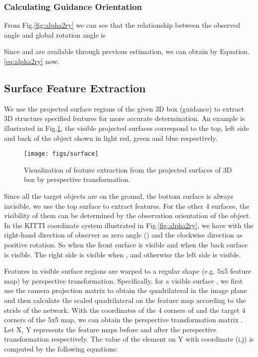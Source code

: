 \documentclass[10pt,twocolumn,letterpaper]{article}
\begin{document}
\subsubsection{Calculating Guidance Orientation } 
From Fig.\ref{fig:alpha2ry} we can see that the relationship between the observed angle  and global rotation angle  is 

Since  and  are available through previous estimation, we can obtain  by Equation.\ref{eq:alpha2ry} now. 


\subsection{Surface Feature Extraction}
\label{sec:surface}
We use the projected surface regions of the given 3D box (guidance) to extract 3D structure specified features for more accurate determination.
An example is illustrated in Fig.\ref{fig:surface}, the visible projected surfaces correspond to the top, left side and back of the object shown in light red, green and blue respectively. 

\begin{figure}[!h]
\centering
\texttt{[image: figs/surface]}
\caption{Visualization of feature extraction from the projected surfaces of 3D box by perspective transformation.}
\label{fig:surface}
\end{figure}

Since all the target objects are on the ground, the bottom surface is always invisible, we use the top surface to extract features. For the other 4 surfaces, the visibility of them can be determined by the observation orientation  of the object. In the KITTI coordinate system illustrated in Fig.\ref{fig:alpha2ry}, we have  with the right-hand direction of observer as zero angle () and the clockwise direction as positive rotation. So when  the front surface is visible and when  the back surface is visible. The right side is visible when , and otherwise the left side is visible.

Features in visible surface regions are warped to a regular shape (e.g. 5x5 feature map) by perspective transformation. Specifically, for a visible surface , we first use the camera projection matrix to obtain the quadrilateral  in the image plane and then calculate the scaled quadrilateral  on the feature map according to the stride of the network. With the coordinates of the 4 corners of  and the target 4 corners of the 5x5 map, we can obtain the perspective transformation matrix . Let X, Y represents the feature maps before and after the perspective transformation respectively. The value of the element on Y with coordinate (i,j) is computed by the following equations:
\end{document}
